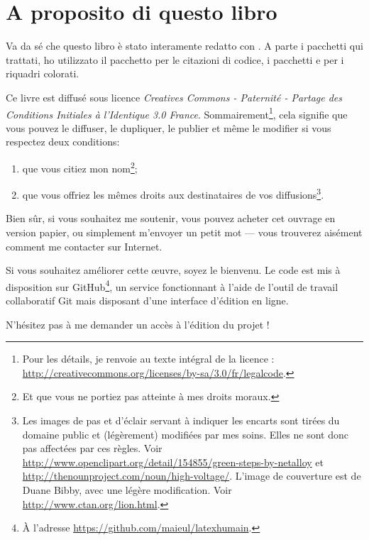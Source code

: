 \section*{A proposito di questo libro}\thispagestyle{plain}

Va da sé che questo libro è stato interamente redatto con \XeLaTeX. A parte i pacchetti qui trattati, ho utilizzato il pacchetto  per le citazioni di codice, i pacchetti  e  per i riquadri colorati.



Ce livre est diffusé sous licence \emph{Creatives Commons - Paternité - Partage des Conditions Initiales à l'Identique 3.0 France}. Sommairement\footnote{Pour les détails, je renvoie au texte intégral de la licence : \url{http://creativecommons.org/licenses/by-sa/3.0/fr/legalcode}.}, cela signifie que vous pouvez le diffuser, le dupliquer, le publier et même le modifier si vous respectez deux conditions:
\begin{enumerate}
\item que vous citiez mon nom\footnote{Et que vous ne portiez  pas atteinte à mes droits moraux.};
\item que vous offriez les mêmes droits aux destinataires de vos diffusions\footnote{Les images de pas et d'éclair servant à indiquer les encarts sont tirées du domaine public et (légèrement) modifiées par mes soins. Elles ne sont donc pas affectées par ces règles. Voir \url{http://www.openclipart.org/detail/154855/green-steps-by-netalloy} et \url{http://thenounproject.com/noun/high-voltage/}. L'image de couverture est de Duane  Bibby, avec une légère modification. Voir \url{http://www.ctan.org/lion.html}.}.
\end{enumerate}

Bien sûr, si vous souhaitez me soutenir, vous pouvez acheter cet ouvrage en version papier, ou simplement m'envoyer un petit mot --- vous trouverez aisément comment me contacter sur Internet.

Si vous souhaitez améliorer cette œuvre, soyez le bienvenu. Le code est mis à disposition sur GitHub\footnote{À l'adresse \url{https://github.com/maieul/latexhumain}.}, un service fonctionnant à l'aide de l'outil de travail collaboratif Git mais disposant d'une interface d'édition en ligne. 

N'hésitez pas à me demander un accès à l'édition du projet ! 

